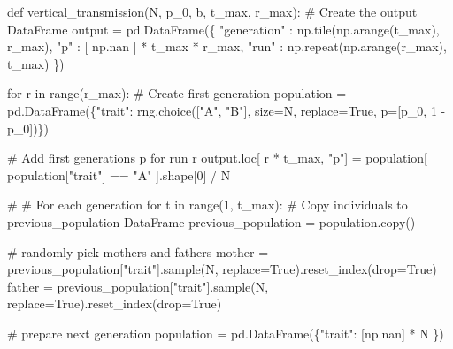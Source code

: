 \documentclass[
  a4paperpaper,
  ,captions=tableheading
]{scrbook}
\newenvironment{Shaded}{\begin{snugshade}}{\end{snugshade}}
\newcommand{\BuiltInTok}[1]{\textcolor[rgb]{0.00,0.23,0.31}{#1}}
\newcommand{\CommentTok}[1]{\textcolor[rgb]{0.37,0.37,0.37}{#1}}
\newcommand{\ControlFlowTok}[1]{\textcolor[rgb]{0.00,0.23,0.31}{#1}}
\newcommand{\DecValTok}[1]{\textcolor[rgb]{0.68,0.00,0.00}{#1}}
\newcommand{\KeywordTok}[1]{\textcolor[rgb]{0.00,0.23,0.31}{#1}}
\newcommand{\NormalTok}[1]{\textcolor[rgb]{0.00,0.23,0.31}{#1}}
\newcommand{\OperatorTok}[1]{\textcolor[rgb]{0.37,0.37,0.37}{#1}}
\newcommand{\StringTok}[1]{\textcolor[rgb]{0.13,0.47,0.30}{#1}}
\newcommand{\VariableTok}[1]{\textcolor[rgb]{0.07,0.07,0.07}{#1}}
\begin{document}
\begin{Shaded}
\begin{Highlighting}[]
\KeywordTok{def}\NormalTok{ vertical\_transmission(N, p\_0, b, t\_max, r\_max):}
    \CommentTok{\# Create the output DataFrame}
\NormalTok{    output }\OperatorTok{=}\NormalTok{ pd.DataFrame(\{}
        \StringTok{"generation"}\NormalTok{ : np.tile(np.arange(t\_max), r\_max),}
        \StringTok{"p"}\NormalTok{ : [ np.nan ] }\OperatorTok{*}\NormalTok{ t\_max }\OperatorTok{*}\NormalTok{ r\_max,}
        \StringTok{"run"}\NormalTok{ : np.repeat(np.arange(r\_max), t\_max)}
\NormalTok{    \})}

    \ControlFlowTok{for}\NormalTok{ r }\KeywordTok{in} \BuiltInTok{range}\NormalTok{(r\_max): }
        \CommentTok{\# Create first generation}
\NormalTok{        population }\OperatorTok{=}\NormalTok{ pd.DataFrame(\{}\StringTok{"trait"}\NormalTok{: rng.choice([}\StringTok{"A"}\NormalTok{, }\StringTok{"B"}\NormalTok{], size}\OperatorTok{=}\NormalTok{N, replace}\OperatorTok{=}\VariableTok{True}\NormalTok{, p}\OperatorTok{=}\NormalTok{[p\_0, }\DecValTok{1} \OperatorTok{{-}}\NormalTok{ p\_0])\})}

        \CommentTok{\# Add first generation\textquotesingle{}s p for run r}
\NormalTok{        output.loc[ r }\OperatorTok{*}\NormalTok{ t\_max, }\StringTok{"p"}\NormalTok{] }\OperatorTok{=}\NormalTok{ population[ population[}\StringTok{"trait"}\NormalTok{] }\OperatorTok{==} \StringTok{"A"}\NormalTok{ ].shape[}\DecValTok{0}\NormalTok{] }\OperatorTok{/}\NormalTok{ N}

        \CommentTok{\# \# For each generation }
        \ControlFlowTok{for}\NormalTok{ t }\KeywordTok{in} \BuiltInTok{range}\NormalTok{(}\DecValTok{1}\NormalTok{, t\_max): }
            \CommentTok{\# Copy individuals to previous\_population DataFrame}
\NormalTok{            previous\_population }\OperatorTok{=}\NormalTok{ population.copy()}

            \CommentTok{\# randomly pick mothers and fathers}
\NormalTok{            mother }\OperatorTok{=}\NormalTok{ previous\_population[}\StringTok{"trait"}\NormalTok{].sample(N, replace}\OperatorTok{=}\VariableTok{True}\NormalTok{).reset\_index(drop}\OperatorTok{=}\VariableTok{True}\NormalTok{)}
\NormalTok{            father }\OperatorTok{=}\NormalTok{ previous\_population[}\StringTok{"trait"}\NormalTok{].sample(N, replace}\OperatorTok{=}\VariableTok{True}\NormalTok{).reset\_index(drop}\OperatorTok{=}\VariableTok{True}\NormalTok{)}

            \CommentTok{\# prepare next generation}
\NormalTok{            population }\OperatorTok{=}\NormalTok{ pd.DataFrame(\{}\StringTok{"trait"}\NormalTok{: [np.nan] }\OperatorTok{*}\NormalTok{ N \})}


\end{Highlighting}
\end{Shaded}
\end{document}
